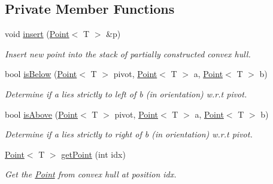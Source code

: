 \subsection*{Private Member Functions}
\begin{DoxyCompactItemize}
\item 
void \mbox{\hyperlink{classGrahamScan_a942f7d7c58a6992600b6adda70e5e14d}{insert}} (\mbox{\hyperlink{classPoint}{Point}}$<$ T $>$ \&p)
\begin{DoxyCompactList}\small\item\em Insert new point into the stack of partially constructed convex hull. \end{DoxyCompactList}\item 
bool \mbox{\hyperlink{classGrahamScan_ad87ba02c8b5dd0ba8e96c2b09e9c9b79}{is\+Below}} (\mbox{\hyperlink{classPoint}{Point}}$<$ T $>$ pivot, \mbox{\hyperlink{classPoint}{Point}}$<$ T $>$ a, \mbox{\hyperlink{classPoint}{Point}}$<$ T $>$ b)
\begin{DoxyCompactList}\small\item\em Determine if \textquotesingle{}a\textquotesingle{} lies strictly to left of \textquotesingle{}b\textquotesingle{} (in orientation) w.\+r.\+t pivot. \end{DoxyCompactList}\item 
bool \mbox{\hyperlink{classGrahamScan_a977e22d33d7ebed099a17c76698be137}{is\+Above}} (\mbox{\hyperlink{classPoint}{Point}}$<$ T $>$ pivot, \mbox{\hyperlink{classPoint}{Point}}$<$ T $>$ a, \mbox{\hyperlink{classPoint}{Point}}$<$ T $>$ b)
\begin{DoxyCompactList}\small\item\em Determine if a lies strictly to right of b (in orientation) w.\+r.\+t pivot. \end{DoxyCompactList}\item 
\mbox{\hyperlink{classPoint}{Point}}$<$ T $>$ \mbox{\hyperlink{classGrahamScan_ae6eec90fe568ee1b61ec1d8bba4c309e}{get\+Point}} (int idx)
\begin{DoxyCompactList}\small\item\em Get the \mbox{\hyperlink{classPoint}{Point}} from convex hull at position \textquotesingle{}idx\textquotesingle{}. \end{DoxyCompactList}\end{DoxyCompactItemize}
